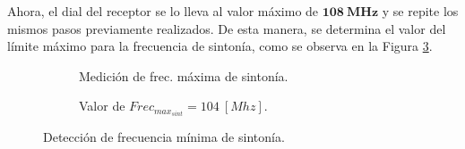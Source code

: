     Ahora, el dial del receptor se lo lleva al valor máximo de \(\mathbf{108~MHz}\) y se 
    repite los mismos pasos previamente realizados. De esta manera, se determina el valor 
    del límite máximo para la frecuencia de sintonía, como se observa en la Figura 
    \ref{fig:FrecMaxtSint}.  
      \begin{figure}[H]
        \centering
        \begin{subfigure}[ht]{0.48\textwidth}
          \caption{Medición de frec. máxima de sintonía.}
          \label{fig:FrecMaxSintConGen}
        \end{subfigure}
        \hfill 
        \begin{subfigure}[ht]{0.48\textwidth}
          \caption{Valor de  \(Frec_{max_{sint}} = 104~[Mhz]\).}
          \label{fig:FrecMaxSintValor}
        \end{subfigure}
        \caption{Detección de frecuencia mínima de sintonía.}
        \label{fig:FrecMaxtSint}
      \end{figure}

